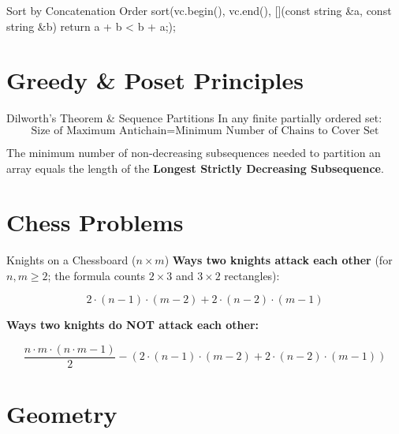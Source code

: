 \documentclass[10pt]{article}
\newcommand{\complexity}[1]{%
  \tcbox[on line,
    colback=tagbg,
    colframe=tagbg,
    boxrule=0pt,
    arc=2pt,
    boxsep=0pt,
    left=3.5pt, right=3.5pt, top=1.5pt, bottom=1.5pt
  ]{\color{tagtext}\scriptsize\bfseries\ensuremath{#1}}%
}
\begin{document}
\begin{vscode}{Sort by Concatenation Order \complexity{O(N \log N \cdot L)}}
sort(vc.begin(), vc.end(), [](const string &a, const string &b) 
{ return a + b < b + a;});
\end{vscode}


\newpage
\section{Greedy \& Poset Principles}

\begin{conceptbox}{Dilworth's Theorem \& Sequence Partitions}
    In any finite partially ordered set:
    \[ \text{Size of Maximum Antichain} = \text{Minimum Number of Chains to Cover Set} \]
    \begin{resultbox}
        The minimum number of non-decreasing subsequences needed to partition an array equals the length of the \textbf{Longest Strictly Decreasing Subsequence}.
    \end{resultbox}
\end{conceptbox}



\section{Chess Problems}

\begin{conceptbox}{Knights on a Chessboard ($n \times m$)}
    \textbf{Ways two knights attack each other} (for $n, m \ge 2$; the formula counts $2 \times 3$ and $3 \times 2$ rectangles):
    \begin{resultbox}
        \[ 2 \cdot (n - 1) \cdot (m - 2) + 2 \cdot (n - 2) \cdot (m - 1) \]
    \end{resultbox}

    \textbf{Ways two knights do NOT attack each other:}
    \begin{resultbox}
        \[
            \frac{n \cdot m \cdot (n \cdot m - 1)}{2} - \left(2 \cdot (n - 1) \cdot (m - 2) + 2 \cdot (n - 2) \cdot (m - 1)\right)
        \]
    \end{resultbox}
\end{conceptbox}

\newpage
\section{Geometry}
\end{document}
